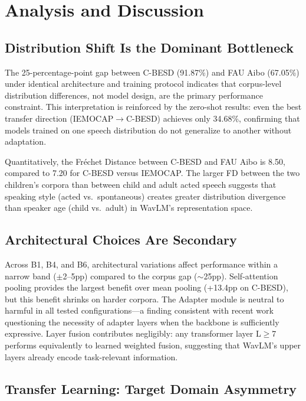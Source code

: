 \section{Analysis and Discussion}

\subsection{Distribution Shift Is the Dominant Bottleneck}

The 25-percentage-point gap between C-BESD (91.87\%) and FAU Aibo (67.05\%) under identical architecture and training protocol indicates that corpus-level distribution differences, not model design, are the primary performance constraint. This interpretation is reinforced by the zero-shot results: even the best transfer direction (IEMOCAP$\rightarrow$C-BESD) achieves only 34.68\%, confirming that models trained on one speech distribution do not generalize to another without adaptation.

Quantitatively, the Fr\'{e}chet Distance between C-BESD and FAU Aibo is 8.50, compared to 7.20 for C-BESD versus IEMOCAP. The larger FD between the two children's corpora than between child and adult acted speech suggests that speaking style (acted vs.\ spontaneous) creates greater distribution divergence than speaker age (child vs.\ adult) in WavLM's representation space.

\subsection{Architectural Choices Are Secondary}

Across B1, B4, and B6, architectural variations affect performance within a narrow band ($\pm$2--5pp) compared to the corpus gap ($\sim$25pp). Self-attention pooling provides the largest benefit over mean pooling (+13.4pp on C-BESD), but this benefit shrinks on harder corpora. The Adapter module is neutral to harmful in all tested configurations---a finding consistent with recent work questioning the necessity of adapter layers when the backbone is sufficiently expressive. Layer fusion contributes negligibly: any transformer layer L$\geq$7 performs equivalently to learned weighted fusion, suggesting that WavLM's upper layers already encode task-relevant information.

\subsection{Transfer Learning: Target Domain Asymmetry}

